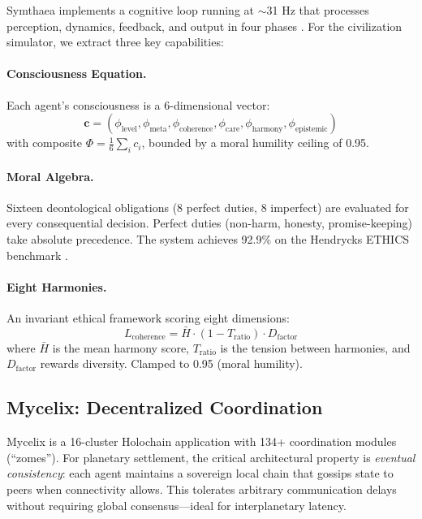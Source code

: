 \documentclass[12pt,a4paper]{article}
\begin{document}
Symthaea implements a cognitive loop running at $\sim$31 Hz that processes perception, dynamics, feedback, and output in four phases \citep{stoltz2026symthaea}. For the civilization simulator, we extract three key capabilities:

\paragraph{Consciousness Equation.} Each agent's consciousness is a 6-dimensional vector:
\begin{equation}
    \mathbf{c} = (\phi_\text{level}, \phi_\text{meta}, \phi_\text{coherence}, \phi_\text{care}, \phi_\text{harmony}, \phi_\text{epistemic})
\end{equation}
with composite $\Phi = \frac{1}{6}\sum_i c_i$, bounded by a moral humility ceiling of 0.95.

\paragraph{Moral Algebra.} Sixteen deontological obligations (8 perfect duties, 8 imperfect) are evaluated for every consequential decision. Perfect duties (non-harm, honesty, promise-keeping) take absolute precedence. The system achieves 92.9\% on the Hendrycks ETHICS benchmark \citep{hendrycks2021aligning}.

\paragraph{Eight Harmonies.} An invariant ethical framework scoring eight dimensions:
\begin{equation}
    L_\text{coherence} = \bar{H} \cdot (1 - T_\text{ratio}) \cdot D_\text{factor}
\end{equation}
where $\bar{H}$ is the mean harmony score, $T_\text{ratio}$ is the tension between harmonies, and $D_\text{factor}$ rewards diversity. Clamped to 0.95 (moral humility).

\subsection{Mycelix: Decentralized Coordination}

Mycelix is a 16-cluster Holochain application with 134+ coordination modules (``zomes''). For planetary settlement, the critical architectural property is \emph{eventual consistency}: each agent maintains a sovereign local chain that gossips state to peers when connectivity allows. This tolerates arbitrary communication delays without requiring global consensus---ideal for interplanetary latency.
\end{document}
